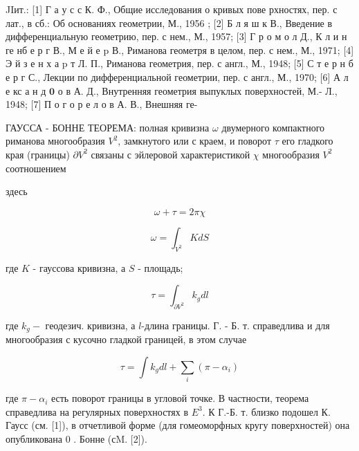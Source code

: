 \documentclass[10pt]{article}
\begin{document}
JIит.: [1] Г а у с с К. Ф., Общие исследования о кривых пове рхностях, пер. с лат., в сб.: Об основаниях геометрии, М., 1956 ; [2] Б л я ш к В., Введение в дифференциальную геометрию, пер. с нем., М., 1957; [3] Г р о м о л Д., К л и н ге нб е р г В., М е й е p В., Риманова геометря в целом, пер. с нем., М., 1971; [4] Э й з е н х а $\mathrm{p}$ т Л. П., Риманова геометрия, пер. с англ., М., 1948; [5] С т е р н б е р г С., Лекции по дифференциальной геометрии, пер. с англ., М., 1970; [6] А л е кс а н д $\mathbf{0}$ о в А. Д., Внутренняя геометрия выпуклых поверхностей, М.- Л., 1948; [7] П о г о р е л о в А. В., Внешняя ге-



ГАУССА - БОННЕ ТЕОРЕМА: полная кривизна $\omega$ двумерного компактного риманова многообразия $V^{2}$, замкнутого или с краем, и поворот $\tau$ его гладкого края (границы) $\partial V^{2}$ связаны с эйлеровой характеристикой $\chi$ многообразия $V^{2}$ соотношением



здесь



\[

\omega+\tau=2 \pi \chi

\]



\[

\omega=\int_{V^{2}} K d S

\]



где $K$ - гауссова кривизна, а $S$ - площадь;



\[

\tau=\int_{\partial V^{2}} k_{g} d l

\]



где $k_{g}-$ геодезич. кривизна, а $l$-длина границы. Г. - Б. т. справедлива и для многообразия с кусочно гладкой границей, в этом случае



\[

\tau=\int k_{g} d l+\sum_{i}\left(\pi-\alpha_{i}\right)

\]



где $\pi-\alpha_{i}$ есть поворот границы в угловой точке. В частности, теорема справедлива на регулярных поверхностях в $E^{3}$. К Г.-Б. т. близко подошел К. Гаусс (см. [1]), в отчетливой форме (для гомеоморфных кругу поверхностей) она опубликована 0 . Бонне (сM. [2]).
\end{document}
